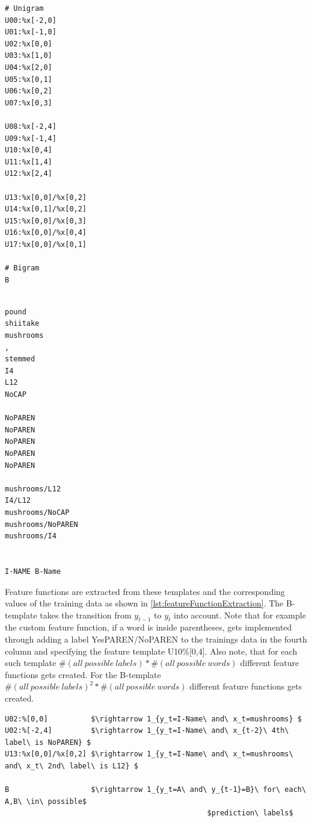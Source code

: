 \documentclass[12pt, twoside]{report}
\begin{document}
\newpage
\begin{minipage}{0.4\textwidth} 
\begin{lstlisting}[frame=single, caption={Feature templates for New York Times CRF}, label=lst:NYTfeatureTemplates]
# Unigram               
U00:%x[-2,0]             
U01:%x[-1,0]              
U02:%x[0,0]
U03:%x[1,0]
U04:%x[2,0]
U05:%x[0,1]
U06:%x[0,2]
U07:%x[0,3]

U08:%x[-2,4]
U09:%x[-1,4]
U10:%x[0,4]
U11:%x[1,4]
U12:%x[2,4]

U13:%x[0,0]/%x[0,2]
U14:%x[0,1]/%x[0,2]
U15:%x[0,0]/%x[0,3]
U16:%x[0,0]/%x[0,4]
U17:%x[0,0]/%x[0,1]

# Bigram
B
\end{lstlisting}
\end{minipage}
\hfill
\begin{minipage}{0.5\textwidth} 
\begin{lstlisting}[frame=single, caption={Derived values when the current word in \cref{lst:NYTTrainingData} is mushrooms}, label=lst:NYTfeatureTemplatesDerivedValue]
            
pound            
shiitake            
mushrooms
,
stemmed
I4
L12
NoCAP

NoPAREN
NoPAREN
NoPAREN
NoPAREN
NoPAREN

mushrooms/L12
I4/L12
mushrooms/NoCAP
mushrooms/NoPAREN
mushrooms/I4


I-NAME B-Name
\end{lstlisting}
\end{minipage}

Feature functions are extracted from these templates and the corresponding values of the training data as shown in \cref{lst:featureFunctionExtraction}. The B-template takes the transition from $y_{t-1}$ to $y_t$ into account. Note that for example the custom feature function, if a word is inside parentheses, gets implemented through adding a label YesPAREN/NoPAREN to the trainings data in the fourth column and specifying the feature template U10\%[0,4]. Also note, that for each such template $\#(all\ possible\ labels)*\#(all\ possible\ words)$ different feature functions gets created. For the B-template $\#(all\ possible\ labels)^2*\#(all\ possible\ words)$ different feature functions gets created.

\begin{lstlisting}[frame=single, caption={Extracting of feature functions from templates}, label=lst:featureFunctionExtraction, mathescape]
U02:%[0,0]          $\rightarrow 1_{y_t=I-Name\ and\ x_t=mushrooms} $
U02:%[-2,4]         $\rightarrow 1_{y_t=I-Name\ and\ x_{t-2}\ 4th\ label\ is NoPAREN} $
U13:%x[0,0]/%x[0,2] $\rightarrow 1_{y_t=I-Name\ and\ x_t=mushrooms\ and\ x_t\ 2nd\ label\ is L12} $

B                   $\rightarrow 1_{y_t=A\ and\ y_{t-1}=B}\ for\ each\ A,B\ \in\ possible$
                                               $prediction\ labels$
\end{lstlisting}
\end{document}
